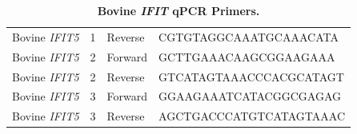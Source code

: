 \begin{table}
\begin{tabular}{lllll}
Bovine \textit{IFIT5} & 1 & Reverse & \multicolumn{2}{l}{CGTGTAGGCAAATGCAAACATA}  \\ 
Bovine \textit{IFIT5} & 2 & Forward & \multicolumn{2}{l}{GCTTGAAACAAGCGGAAGAAA}   \\ 
Bovine \textit{IFIT5} & 2 & Reverse & \multicolumn{2}{l}{GTCATAGTAAACCCACGCATAGT} \\ 
Bovine \textit{IFIT5} & 3 & Forward & \multicolumn{2}{l}{GGAAGAAATCATACGGCGAGAG}  \\ 
Bovine \textit{IFIT5} & 3 & Reverse & \multicolumn{2}{l}{AGCTGACCCATGTCATAGTAAAC} \\ \bottomrule
\end{tabular}
\caption[Bovine \textit{IFIT} qPCR Primers.]{\textbf{Bovine \textit{IFIT} qPCR Primers.}}
\label{tab:Bovine IFIT qPCR Primers table}
\end{table}

